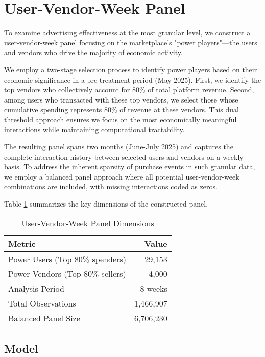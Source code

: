 \section*{User-Vendor-Week Panel}

To examine advertising effectiveness at the most granular level, we construct a user-vendor-week panel focusing on the marketplace's "power players"—the users and vendors who drive the majority of economic activity. 

We employ a two-stage selection process to identify power players based on their economic significance in a pre-treatment period (May 2025). First, we identify the top vendors who collectively account for 80\% of total platform revenue. Second, among users who transacted with these top vendors, we select those whose cumulative spending represents 80\% of revenue at these vendors. This dual threshold approach ensures we focus on the most economically meaningful interactions while maintaining computational tractability.

The resulting panel spans two months (June-July 2025) and captures the complete interaction history between selected users and vendors on a weekly basis. To address the inherent sparsity of purchase events in such granular data, we employ a balanced panel approach where all potential user-vendor-week combinations are included, with missing interactions coded as zeros.

Table \ref{tab:uvw_panel_dims} summarizes the key dimensions of the constructed panel.

\begin{table}[htbp!]
\centering
\caption{User-Vendor-Week Panel Dimensions}
\label{tab:uvw_panel_dims}
\begin{tabular}{lr}
\toprule
Metric & Value \\
\midrule
Power Users (Top 80\% spenders) & 29,153 \\
Power Vendors (Top 80\% sellers) & 4,000 \\
Analysis Period & 8 weeks \\
Total Observations & 1,466,907 \\
Balanced Panel Size & 6,706,230 \\
\bottomrule
\end{tabular}
\end{table}

\subsection*{Model}

